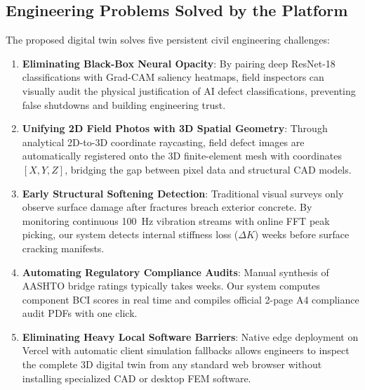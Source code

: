 \documentclass[10pt, conference, letterpaper]{IEEEtran}
\begin{document}
\subsection{Engineering Problems Solved by the Platform}
The proposed digital twin solves five persistent civil engineering challenges:
\begin{enumerate}
    \item \textbf{Eliminating Black-Box Neural Opacity}: By pairing deep ResNet-18 classifications with Grad-CAM saliency heatmaps, field inspectors can visually audit the physical justification of AI defect classifications, preventing false shutdowns and building engineering trust.
    \item \textbf{Unifying 2D Field Photos with 3D Spatial Geometry}: Through analytical 2D-to-3D coordinate raycasting, field defect images are automatically registered onto the 3D finite-element mesh with coordinates $[X,Y,Z]$, bridging the gap between pixel data and structural CAD models.
    \item \textbf{Early Structural Softening Detection}: Traditional visual surveys only observe surface damage after fractures breach exterior concrete. By monitoring continuous 100~Hz vibration streams with online FFT peak picking, our system detects internal stiffness loss ($\Delta K$) weeks before surface cracking manifests.
    \item \textbf{Automating Regulatory Compliance Audits}: Manual synthesis of AASHTO bridge ratings typically takes weeks. Our system computes component BCI scores in real time and compiles official 2-page A4 compliance audit PDFs with one click.
    \item \textbf{Eliminating Heavy Local Software Barriers}: Native edge deployment on Vercel with automatic client simulation fallbacks allows engineers to inspect the complete 3D digital twin from any standard web browser without installing specialized CAD or desktop FEM software.
\end{enumerate}
\end{document}
